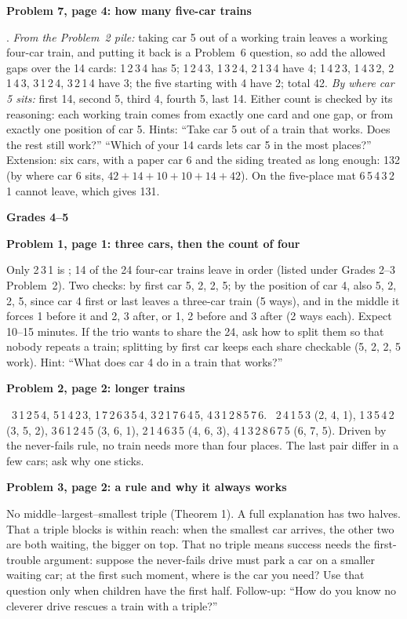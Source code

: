 \documentclass[11pt]{article}
\newcommand{\head}[1]{\par\needspace{5\baselineskip}\textbf{\large #1}\par\nopagebreak}
\newcommand{\sub}[1]{\par\needspace{3\baselineskip}\textbf{#1}\par\nopagebreak}
\newcommand{\yes}{\ding{51}}\newcommand{\no}{\ding{55}}
\newcommand{\tr}[1]{\mbox{#1}}
\begin{document}
\sub{Problem 7, page 4: how many five-car trains}
42. \emph{From the Problem~2 pile:} taking car 5 out of a working train leaves a working four-car train, and putting it back is a Problem~6 question, so add the allowed gaps over the 14 cards: \tr{1\,2\,3\,4} has 5; \tr{1\,2\,4\,3}, \tr{1\,3\,2\,4}, \tr{2\,1\,3\,4} have 4; \tr{1\,4\,2\,3}, \tr{1\,4\,3\,2}, \tr{2\,1\,4\,3}, \tr{3\,1\,2\,4}, \tr{3\,2\,1\,4} have 3; the five starting with 4 have 2; total 42. \emph{By where car 5 sits:} first 14, second 5, third 4, fourth 5, last 14. Either count is checked by its reasoning: each working train comes from exactly one card and one gap, or from exactly one position of car 5. Hints: ``Take car 5 out of a train that works. Does the rest still work?'' ``Which of your 14 cards lets car 5 in the most places?'' Extension: six cars, with a paper car 6 and the siding treated as long enough: 132 (by where car 6 sits, $42+14+10+10+14+42$). On the five-place mat \tr{6\,5\,4\,3\,2\,1} cannot leave, which gives 131.

\head{Grades 4--5}
\sub{Problem 1, page 1: three cars, then the count of four}
Only \tr{2\,3\,1} is \no; 14 of the 24 four-car trains leave in order (listed under Grades 2--3 Problem~2). Two checks: by first car 5, 2, 2, 5; by the position of car 4, also 5, 2, 2, 5, since car 4 first or last leaves a three-car train (5 ways), and in the middle it forces 1 before it and 2, 3 after, or 1, 2 before and 3 after (2 ways each). Expect 10--15 minutes. If the trio wants to share the 24, ask how to split them so that nobody repeats a train; splitting by first car keeps each share checkable (5, 2, 2, 5 work). Hint: ``What does car 4 do in a train that works?''

\sub{Problem 2, page 2: longer trains}
\yes~\tr{3\,1\,2\,5\,4}, \tr{5\,1\,4\,2\,3}, \tr{1\,7\,2\,6\,3\,5\,4}, \tr{3\,2\,1\,7\,6\,4\,5}, \tr{4\,3\,1\,2\,8\,5\,7\,6}. \no~\tr{2\,4\,1\,5\,3} (2, 4, 1), \tr{1\,3\,5\,4\,2} (3, 5, 2), \tr{3\,6\,1\,2\,4\,5} (3, 6, 1), \tr{2\,1\,4\,6\,3\,5} (4, 6, 3), \tr{4\,1\,3\,2\,8\,6\,7\,5} (6, 7, 5). Driven by the never-fails rule, no train needs more than four places. The last pair differ in a few cars; ask why one sticks.

\sub{Problem 3, page 2: a rule and why it always works}
No middle--largest--smallest triple (Theorem 1). A full explanation has two halves. That a triple blocks is within reach: when the smallest car arrives, the other two are both waiting, the bigger on top. That no triple means success needs the first-trouble argument: suppose the never-fails drive must park a car on a smaller waiting car; at the first such moment, where is the car you need? Use that question only when children have the first half. Follow-up: ``How do you know no cleverer drive rescues a train with a triple?''
\end{document}

